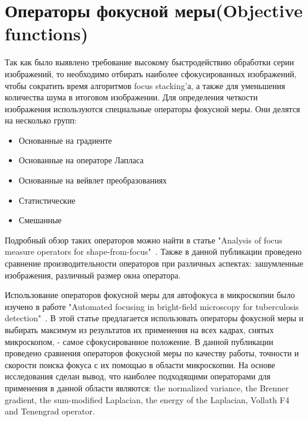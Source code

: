 \documentclass[14pt]{matmex-diploma-custom}
\begin{document}

\section{Операторы фокусной меры(Objective functions)}
Так как было выявлено требование высокому быстродействию обработки серии изображений, то необходимо отбирать наиболее сфокусированных изображений, чтобы сократить время алгоритмов focus stacking'а, а также для уменьшения количества шума в итоговом изображении. Для определения четкости изображения используются специальные операторы фокусной меры. Они делятся на несколько групп:
\begin{itemize}
    \item Основанные на градиенте
    \item Основанные на операторе Лапласа
    \item Основанные на вейвлет преобразованиях
    \item Статистические
    \item Смешанные
\end{itemize}

Подробный обзор таких операторов можно найти в статье "Analysis of focus measure operators for shape-from-focus"~\cite{MeasureOperators}. Также в данной публикации проведено сравнение производительности операторов при различных аспектах: зашумленные изображения, различный размер окна оператора. 

Использование операторов фокусной меры для автофокуса в микроскопии было изучено в работе "Automated focusing in bright-field microscopy for tuberculosis detection"~\cite{BestOperators}. В этой статье предлагается использовать операторы фокусной меры и выбирать максимум из результатов их применения на всех кадрах, снятых микроскопом, - самое сфокусированное положение. В данной публикации проведено сравнения операторов фокусной меры по качеству работы, точности и скорости поиска фокуса с их помощью в области микроскопии. На основе исследования сделан вывод, что наиболее подходящими операторами для применения в данной области являются: the normalized variance, the Brenner gradient, the sum-modified Laplacian, the energy of the Laplacian, Vollath F4 and Tenengrad operator.
\end{document}
